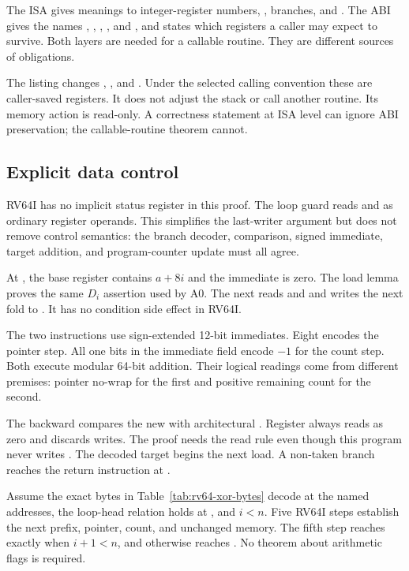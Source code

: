 \begin{sidebar}[title={The proof uses the ABI without confusing it with the ISA}]
The ISA gives meanings to integer-register numbers, , branches, and
. The ABI gives the names , , ,
, and , and states which registers a caller may expect to
survive. Both layers are needed for a callable routine. They are different
sources of obligations.
\end{sidebar}

The listing changes , , and . Under the selected
calling convention these are caller-saved registers. It does not adjust the
stack or call another routine. Its memory action is read-only. A correctness
statement at ISA level can ignore ABI preservation; the callable-routine
theorem cannot.

\subsection{Explicit data control}

RV64I has no implicit status register in this proof. The loop guard reads
 and  as ordinary register operands. This simplifies the
last-writer argument but does not remove control semantics: the branch decoder,
comparison, signed immediate, target addition, and program-counter update must
all agree.

At , the base register  contains \(a+8i\) and the immediate
is zero. The load lemma proves the same \(D_i\) assertion used by A0. The next
 reads  and  and writes the next fold to
. It has no condition side effect in RV64I.

The two  instructions use sign-extended 12-bit immediates. Eight
encodes the pointer step. All one bits in the immediate field encode \(-1\)
for the count step. Both execute modular 64-bit addition. Their logical
readings come from different premises: pointer no-wrap for the first and
positive remaining count for the second.

The backward  compares the new  with architectural
. Register  always reads as zero and discards writes. The
proof needs the read rule even though this program never writes .
The decoded target  begins the next load. A non-taken branch reaches
the return instruction at .

\begin{proofkit}[title={RV64I-to-logical body theorem}]
Assume the exact bytes in Table~\ref{tab:rv64-xor-bytes} decode at the named
addresses, the loop-head relation holds at , and \(i<n\). Five RV64I
steps establish the next prefix, pointer, count, and unchanged memory. The
fifth step reaches  exactly when \(i+1<n\), and otherwise reaches
. No theorem about arithmetic flags is required.
\end{proofkit}

